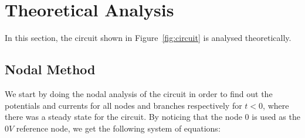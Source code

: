 \section{Theoretical Analysis}
\label{sec:analysis}

In this section, the circuit shown in Figure~\ref{fig:circuit} is analysed
theoretically.


\subsection{Nodal Method}

We start by doing the nodal analysis of the circuit in order to find out the potentials and currents for all nodes and branches respectively for $t < 0$,
where there was a steady state for the circuit. By noticing that the node 0 is used as the $0 V$ reference node, we get the following system of equations:




